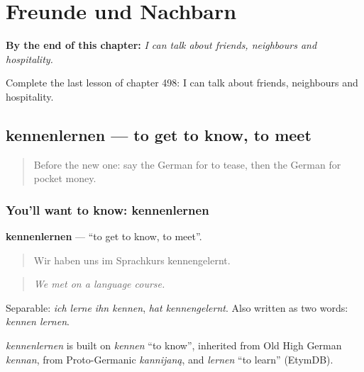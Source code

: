 
\chapter{Freunde und Nachbarn}
\label{ch:ge-freunde-und-nachbarn}

\begin{chapteropening}
\textbf{By the end of this chapter:} \emph{I can talk about friends, neighbours and hospitality.}

Complete the last lesson of chapter 498: I can talk about friends, neighbours and hospitality.
\end{chapteropening}

\section[kennenlernen]{kennenlernen — to get to know, to meet}

\label{lesson:GE-C498-kennenlernen}



\begin{quote}
Before the new one: say the German for to tease, then the German for pocket money.
\end{quote}

\subsection*{You'll want to know: kennenlernen}
\textbf{kennenlernen} — \textquotedblleft{}to get to know, to meet\textquotedblright{}.

\begin{quote}
Wir haben uns im Sprachkurs kennengelernt.
\end{quote}

\begin{quote}
\emph{We met on a language course.}
\end{quote}

Separable: \emph{ich lerne ihn kennen}, \emph{hat kennengelernt}. Also written as two words: \emph{kennen lernen}.

\begin{cousinweb}
\emph{kennenlernen} is built on \emph{kennen} \textquotedblleft{}to know\textquotedblright{}, inherited from Old High German \emph{kennan}, from Proto-Germanic \emph{kannijaną}, and \emph{lernen} \textquotedblleft{}to learn\textquotedblright{} (EtymDB).
\end{cousinweb}

